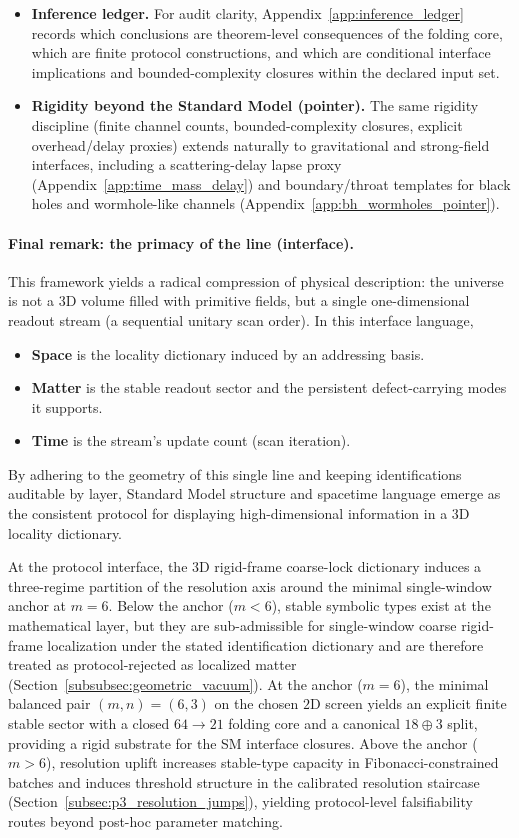 \begin{itemize}
\item \textbf{Inference ledger.}
For audit clarity, Appendix~\ref{app:inference_ledger} records which conclusions are theorem-level consequences of the folding core, which are finite protocol constructions, and which are conditional interface implications and bounded-complexity closures within the declared input set.
\item \textbf{Rigidity beyond the Standard Model (pointer).}
The same rigidity discipline (finite channel counts, bounded-complexity closures, explicit overhead/delay proxies) extends naturally to gravitational and strong-field interfaces, including a scattering-delay lapse proxy (Appendix~\ref{app:time_mass_delay}) and boundary/throat templates for black holes and wormhole-like channels (Appendix~\ref{app:bh_wormholes_pointer}).
\end{itemize}

\paragraph{Final remark: the primacy of the line (interface).}
This framework yields a radical compression of physical description:
the universe is not a $3$D volume filled with primitive fields, but a single one-dimensional readout stream (a sequential unitary scan order).
In this interface language,
\begin{itemize}
\item \textbf{Space} is the locality dictionary induced by an addressing basis.
\item \textbf{Matter} is the stable readout sector and the persistent defect-carrying modes it supports.
\item \textbf{Time} is the stream's update count (scan iteration).
\end{itemize}
By adhering to the geometry of this single line and keeping identifications auditable by layer, Standard Model structure and spacetime language emerge as the consistent protocol for displaying high-dimensional information in a $3$D locality dictionary.

At the protocol interface, the $3$D rigid-frame coarse-lock dictionary induces a three-regime partition of the resolution axis around the minimal single-window anchor at $m=6$.
Below the anchor ($m<6$), stable symbolic types exist at the mathematical layer, but they are sub-admissible for single-window coarse rigid-frame localization under the stated identification dictionary and are therefore treated as protocol-rejected as localized matter (Section~\ref{subsubsec:geometric_vacuum}).
At the anchor ($m=6$), the minimal balanced pair $(m,n)=(6,3)$ on the chosen $2$D screen yields an explicit finite stable sector with a closed $64\to 21$ folding core and a canonical $18\oplus 3$ split, providing a rigid substrate for the SM interface closures.
Above the anchor ($m>6$), resolution uplift increases stable-type capacity in Fibonacci-constrained batches and induces threshold structure in the calibrated resolution staircase (Section~\ref{subsec:p3_resolution_jumps}), yielding protocol-level falsifiability routes beyond post-hoc parameter matching.

